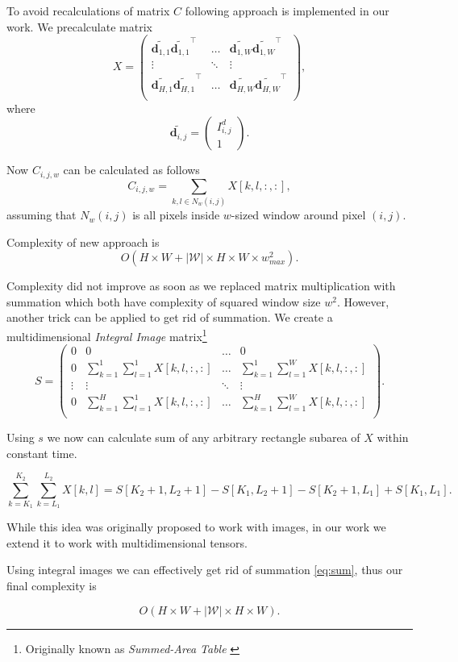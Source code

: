 To avoid recalculations of matrix $C$ following approach is implemented in our work. We precalculate matrix
\[
X = 
\begin{pmatrix}
\tilde{\bm{d}_{1,1}} \tilde{\bm{d}_{1,1}}^\top & \dots & \tilde{\bm{d}_{1,W}} \tilde{\bm{d}_{1,W}}^\top \\
\vdots & \ddots & \vdots \\
\tilde{\bm{d}_{H,1}} \tilde{\bm{d}_{H,1}}^\top & \dots & \tilde{\bm{d}_{H,W}} \tilde{\bm{d}_{H,W}}^\top \\
\end{pmatrix},
\]
where
\[
\tilde{\bm{d}_{i,j}} = \begin{pmatrix}
I^d_{i,j} \\
1
\end{pmatrix}.
\]

Now $C_{i,j,w}$ can be calculated as follows
\[
C_{i,j,w} = \sum_{k, l \in N_w(i, j)} X[k,l,:,:],
\label{eq:sum}
\]
assuming that $N_w(i, j)$ is all pixels inside $w$-sized window around pixel $(i, j)$.

Complexity of new approach is 
\[
O\left(H \times W + \left|\mathcal{W}\right| \times H \times W \times w_{max} ^ 2\right).
\]

Complexity did not improve as soon as we replaced matrix multiplication with summation which both have complexity of squared window size $w^2$. However, another trick can be applied to get rid of summation. We create a multidimensional \textit{Integral Image} matrix\footnote{Originally known as \textit{Summed-Area Table} \cite{integral-image}}
\[
S = 
\begin{pmatrix}
0 & 0 & \dots & 0 \\
0 & \sum_{k=1}^1 \sum_{l=1}^1 X[k,l,:,:] & \dots & \sum_{k=1}^1 \sum_{l = 1}^W X[k,l,:,:] \\
\vdots & \vdots & \ddots & \vdots \\
0 & \sum_{k=1}^H \sum_{l=1}^1 X[k,l,:,:] & \dots & \sum_{k=1}^H \sum_{l=1}^W X[k,l,:,:] \\
\end{pmatrix}.
\]

Using $s$ we now can calculate sum of any arbitrary rectangle subarea of $X$ within constant time.

\[
\sum_{k=K_1}^{K_2} \sum_{k=L_1}^{L_2} X[k,l] = S[K_2+1, L_2+1] - S[K_1, L_2+1] - S[K_2+1, L_1] + S[K_1, L_1].
\]

While this idea was originally proposed to work with images, in our work we extend it to work with multidimensional tensors.

Using integral images we can effectively get rid of summation \ref{eq:sum}, thus our final complexity is

\[
O\left(H \times W + \left|\mathcal{W}\right| \times H \times W \right).
\]